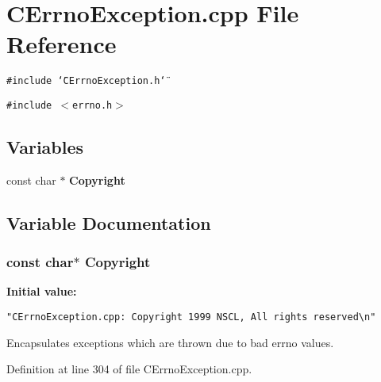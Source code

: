 \section{CErrno\-Exception.cpp File Reference}
\label{CErrnoException_8cpp}
{\tt \#include \char`\"{}CErrno\-Exception.h\char`\"{}}\par
{\tt \#include $<$errno.h$>$}\par
\subsection*{Variables}
\begin{CompactItemize}
\item 
const char $\ast$ {\bf Copyright}
\end{CompactItemize}


\subsection{Variable Documentation}
\subsubsection{\setlength{\rightskip}{0pt plus 5cm}const char$\ast$ Copyright\hspace{0.3cm}{\tt  [static]}}\label{CErrnoException_8cpp_a0}


{\bf Initial value:}

\footnotesize\begin{verbatim} 
"CErrnoException.cpp: Copyright 1999 NSCL, All rights reserved\n"\end{verbatim}\normalsize 
Encapsulates exceptions which are thrown due to bad errno values. 

Definition at line 304 of file CErrno\-Exception.cpp.